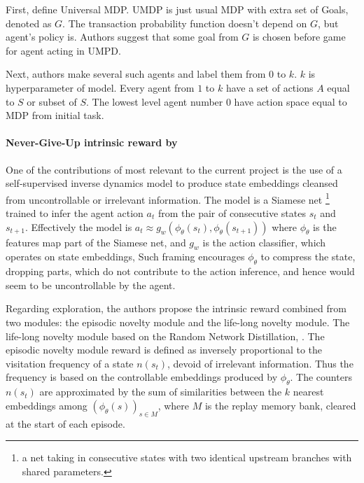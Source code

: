 \documentclass{article}
\begin{document}
First, define Universal MDP. UMDP is just usual MDP with extra set of Goals, denoted as $G$. The transaction probability function doesn't depend on $G$, but agent's policy is. Authors suggest that some goal from $G$ is chosen before game for agent acting in UMPD.

Next, authors make several such agents and label them from $0$ to $k$. $k$ is hyperparameter of model. Every agent from $1$ to $k$ have a set of actions $A$ equal to $S$ or subset of $S$. The lowest level agent number $0$ have action space equal to MDP from initial task.


\paragraph{Never-Give-Up intrinsic reward by~\citet{badia_never_2020}} %
\label{par:never_give_up}

One of the contributions of most relevant to the current project is the use of a self-supervised inverse dynamics model to produce state embeddings cleansed from uncontrollable or irrelevant information.
%
The model is a Siamese net%
\footnote{
    a net taking in consecutive states with two identical upstream branches with shared parameters.
}
trained to infer the agent action $a_t$ from the pair of consecutive states $s_t$ and $s_{t+1}$. Effectively the model is $
    a_t \approx g_w(\phi_\theta(s_t), \phi_\theta(s_{t+1}))
$ where $\phi_\theta$ is the features map part of the Siamese net, and $g_w$ is the action classifier, which operates on state embeddings, Such framing encourages $\phi_\theta$ to compress the state, dropping parts, which do not contribute to the action inference, and hence would seem to be uncontrollable by the agent.

Regarding exploration, the authors propose the intrinsic reward combined from two modules: the episodic novelty module and the life-long novelty module.
%
The life-long novelty module based on the Random Network Distillation, \citep{burda_exploration_2019}.
%
The episodic novelty module reward is defined as inversely proportional to the visitation frequency of a state $n(s_t)$, devoid of irrelevant information. Thus the frequency is based on the controllable embeddings produced by $\phi_\theta$.
The counters $n(s_t)$ are approximated by the sum of similarities between the $k$ nearest embeddings among  $(\phi_\theta(s))_{s\in M}$, where $M$ is the replay memory bank, cleared at the start of each episode.
\end{document}

